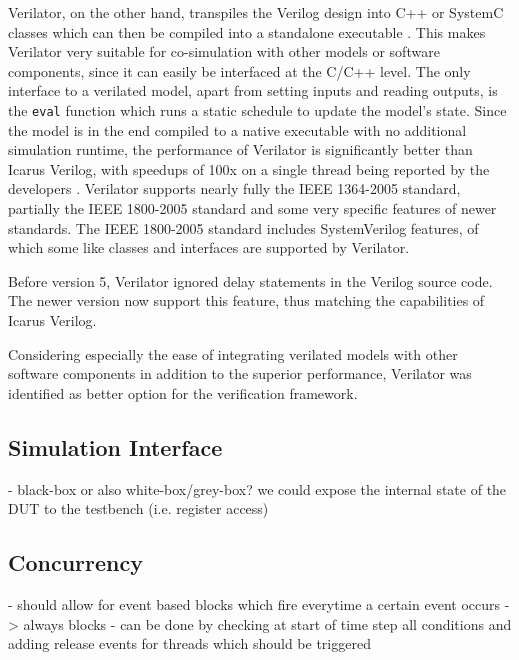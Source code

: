\documentclass[11pt]{report}
\begin{document}
Verilator, on the other hand, transpiles the Verilog design into C++ or SystemC classes which can then be compiled
into a standalone executable \cite{verilator}. This makes Verilator very suitable for co-simulation with other models
or software components, since it can easily be interfaced at the C/C++ level. The only interface to a verilated
model, apart from setting inputs and reading outputs, is the \texttt{eval} function which runs a static schedule to
update the model's state. Since the model is in the end compiled to a native executable with no additional simulation
runtime, the performance of Verilator is significantly better than Icarus Verilog, with speedups of 100x on a single
thread being reported by the developers \cite{verilator}. Verilator supports nearly fully the IEEE 1364-2005
standard, partially the IEEE 1800-2005 standard and some very specific features of newer standards. The IEEE
1800-2005 standard includes SystemVerilog features, of which some like classes and interfaces are supported by Verilator.

Before version 5, Verilator ignored delay statements in the Verilog source code. The newer version now support this
feature, thus matching the capabilities of Icarus Verilog.

Considering especially the ease of integrating verilated models with other software components in addition to the
superior performance, Verilator was identified as better option for the verification framework.

\subsection{Simulation Interface} %

- black-box or also white-box/grey-box? we could expose the internal state of the DUT to the testbench (i.e. register access)

\subsection{Concurrency} %

- should allow for event based blocks which fire everytime a certain event occurs -> always blocks
- can be done by checking at start of time step all conditions and adding release events for threads which should be triggered
\end{document}
